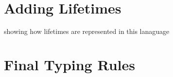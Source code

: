 \section{Adding Lifetimes}
showing how lifetimes are represented in this lanaguage

\section{Final Typing Rules}

